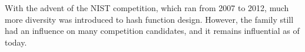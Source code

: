 With the advent of the NIST \shathree competition, which ran from 2007 to 2012, much more diversity was introduced to hash function design. However, the \mdsha family still had an influence on many competition candidates, and it remains
influential as of today.

%
%
%
%
